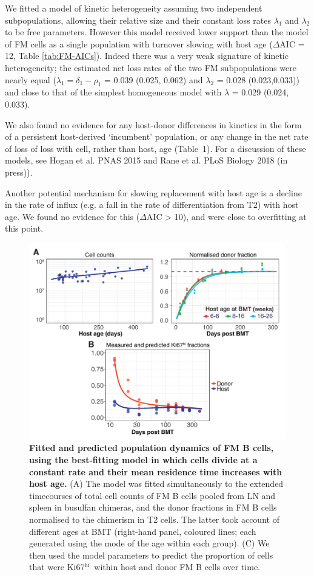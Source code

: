 \documentclass[11pt]{article}
\newcommand{\khi}{Ki67$^\text{hi}$}
\begin{document}
We fitted a model of kinetic heterogeneity assuming two independent subpopulations, allowing their relative size and their constant loss rates $\lambda_{1}$ and $\lambda_{2}$ to be free parameters. However this model received lower support than the model of FM cells as a single population with turnover slowing with host age ($\Delta$AIC = 12, Table \ref{tab:FM-AICs}).   Indeed there was a very weak signature of kinetic heterogeneity;  the estimated net loss rates of the two FM subpopulations  were nearly equal  ($\lambda_{1} =\delta_{1} -\rho_{1}$ = 0.039 (0.025, 0.062) and  $\lambda_{2}$ = 0.028 (0.023,0.033)) and close to that of the simplest homogeneous model with $\lambda$ = 0.029 (0.024, 0.033).

We also found no evidence for any host-donor differences in kinetics in the form of a persistent host-derived `incumbent' population, or any change in the net rate of loss of loss with cell, rather than host, age (Table~1). For a discussion of these models, see Hogan et al. PNAS 2015 and Rane et al. PLoS Biology 2018 (in press)). 

Another potential mechanism for slowing replacement with host age is a decline in the rate of influx (e.g. a fall in the rate of differentiation from T2) with host age. We found no evidence for this ($\Delta$AIC > 10), and were close to overfitting at this point.

\begin{figure}[h!]
	\centerline{\includegraphics[scale = 0.85] {Results_FM.pdf}}
	\caption{\small \textbf{Fitted and predicted   population dynamics of FM B cells, using the best-fitting model in which cells divide at a constant rate and their mean residence time increases with host age.}  (A) The model was fitted simultaneously to the extended timecourses of total cell counts of FM B cells pooled from LN and spleen in busulfan chimeras,  and the donor fractions in FM B cells normalised to the chimerism in T2 cells. The latter took account of different ages at BMT (right-hand panel, coloured lines; each generated using the  mode of the age within each group). (C) We then used the model parameters to predict the proportion of cells that were \khi\ within host and donor FM B cells over time.}
	\label{fig:results_FM}
\end{figure}
\end{document}
